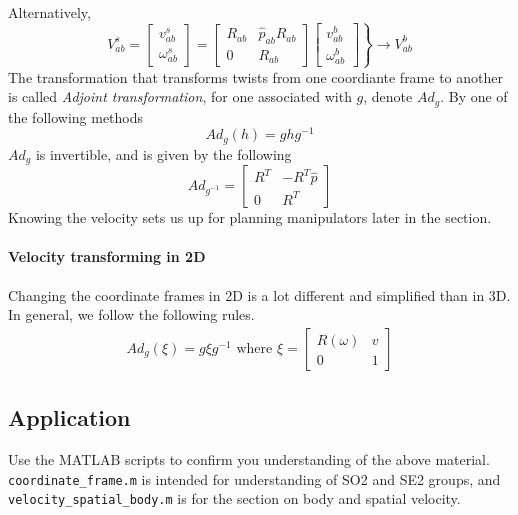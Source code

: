 \documentclass[letterpaper]{article}
\begin{document}
Alternatively, 
\begin{equation*}
  V^{s}_{ab} = \begin{bmatrix}
    v^{s}_{ab}\\\omega^{s}_{ab}
  \end{bmatrix} = 
  \begin{bmatrix}
    R_{ab} & \widehat{p}_{ab}R_{ab}\\
    0 & R_{ab}
  \end{bmatrix}
  \left.\begin{bmatrix}
    v^{b}_{ab}\\\omega^b_{ab}
  \end{bmatrix}\right\}\rightarrow V^{b}_{ab}
\end{equation*}
The transformation that transforms twists from one coordiante frame to another is called
\emph{Adjoint transformation}, for one associated with $g$, denote $Ad_g$.
By one of the following methods
\begin{equation*}
    Ad_g\left(h\right) = g h g^{-1}
\end{equation*}
$Ad_g$ is invertible, and is given by the following
\begin{equation*}
  Ad_{g^{-1}} = \begin{bmatrix}
    R^T & -R^T\widehat{p} \\ 0 & R^T
  \end{bmatrix}
\end{equation*}
Knowing the velocity sets us up for planning manipulators later in the section. 

\paragraph{Velocity transforming in 2D}
Changing the coordinate frames in 2D is a lot different and simplified than in 3D. In general, we follow the following rules.
\begin{equation*}
  \begin{split}
    Ad_g\left(\xi\right) = g \xi g^{-1} \text{ where } \xi = \begin{bmatrix}
      R(\omega) & v \\ 0 & 1
    \end{bmatrix}
  \end{split}
\end{equation*}

\subsection{Application}
Use the MATLAB scripts to confirm you understanding of the above material. \texttt{coordinate\_frame.m}
is intended for understanding of SO2 and SE2 groups, and \texttt{velocity\_spatial\_body.m} is for the
section on body and spatial velocity. 
\end{document}
